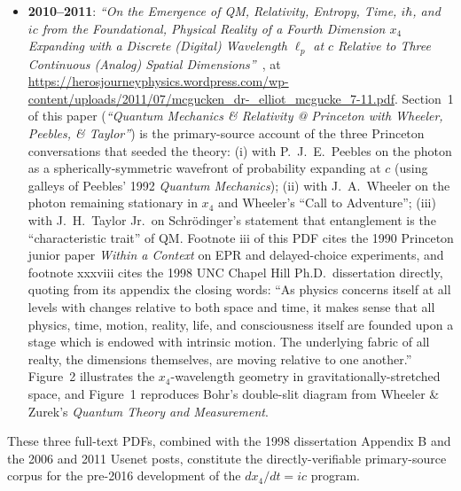\documentclass[11pt,a4paper]{article}
\begin{document}
\begin{itemize}
\item \textbf{2010--2011}: \emph{``On the Emergence of QM, Relativity, Entropy, Time, $i\hbar$, and $ic$ from the Foundational, Physical Reality of a Fourth Dimension $x_4$ Expanding with a Discrete (Digital) Wavelength $\ell_p$ at $c$ Relative to Three Continuous (Analog) Spatial Dimensions''}~\cite{mcguckenemergencepdf2010}, at \url{https://herosjourneyphysics.wordpress.com/wp-content/uploads/2011/07/mcgucken_dr-_elliot_mcgucke_7-11.pdf}. Section~1 of this paper (\emph{``Quantum Mechanics \& Relativity @ Princeton with Wheeler, Peebles, \& Taylor''}) is the primary-source account of the three Princeton conversations that seeded the theory: (i) with P.\ J.\ E.\ Peebles on the photon as a spherically-symmetric wavefront of probability expanding at $c$ (using galleys of Peebles' 1992 \emph{Quantum Mechanics}); (ii) with J.\ A.\ Wheeler on the photon remaining stationary in $x_4$ and Wheeler's ``Call to Adventure''; (iii) with J.\ H.\ Taylor Jr.\ on Schr\"odinger's statement that entanglement is the ``characteristic trait'' of QM. Footnote iii of this PDF cites the 1990 Princeton junior paper \emph{Within a Context} on EPR and delayed-choice experiments, and footnote xxxviii cites the 1998 UNC Chapel Hill Ph.D.\ dissertation directly, quoting from its appendix the closing words: ``As physics concerns itself at all levels with changes relative to both space and time, it makes sense that all physics, time, motion, reality, life, and consciousness itself are founded upon a stage which is endowed with intrinsic motion. The underlying fabric of all realty, the dimensions themselves, are moving relative to one another.'' Figure~2 illustrates the $x_4$-wavelength geometry in gravitationally-stretched space, and Figure~1 reproduces Bohr's double-slit diagram from Wheeler \& Zurek's \emph{Quantum Theory and Measurement}.
\end{itemize}

These three full-text PDFs, combined with the 1998 dissertation Appendix B and the 2006 and 2011 Usenet posts, constitute the directly-verifiable primary-source corpus for the pre-2016 development of the $dx_4/dt = ic$ program.
\end{document}
